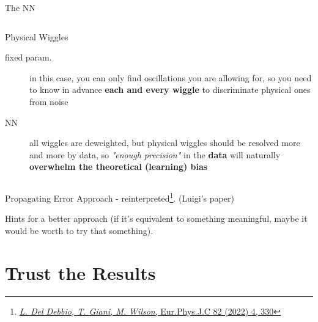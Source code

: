 \documentclass[9pt]{beamer}
\begin{document}
\begin{frame}{The NN}
\begin{columns}
\begin{column}{0.5\textwidth}
\begin{exampleblock}{Physical Wiggles}
                \begin{description}
                    \item[fixed param.] in this case, you can only find
                        oscillations you are allowing for, so you need to know
                        in advance \textbf{each and every wiggle} to
                        discriminate physical ones from noise
                    \item[NN] all wiggles are deweighted, but physical wiggles
                        should be resolved more and more by data, so
                        \textit{"enough precision"} in the
                        \alert{\textbf{data}} will naturally
                        \textbf{\alert{overwhelm} the theoretical
                        \alert{(learning) bias}}
                \end{description}
            \end{exampleblock}
        \end{column}
    \end{columns}
\end{frame}

\begin{frame}{Propagating Error}
    \nnpdf{} Approach - reinterpreted\footnote{
        \href{https://doi.org/10.1140/epjc/s10052-022-10297-x}{\textit{L. Del
        Debbio, T. Giani, M. Wilson}, Eur.Phys.J.C 82 (2022) 4, 330}
    }. (Luigi's paper)

    Hints for a better approach (if it's equivalent to something meaningful,
    maybe it would be worth to try that something).

    
\end{frame}

\section{Trust the Results}
\end{document}
